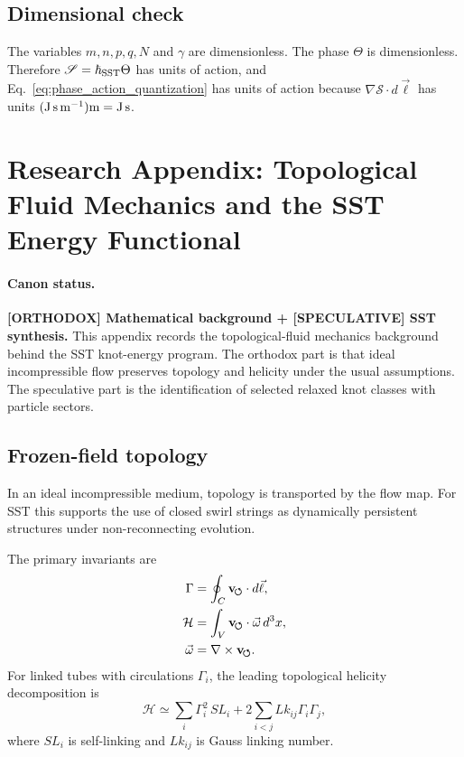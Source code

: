 \subsection{Dimensional check}
The variables $m,n,p,q,N$ and $\gamma$ are dimensionless. The phase $\Theta$ is dimensionless. Therefore $\mathscr S=\hbar_{\rm SST}\Theta$ has units of action, and Eq.~\eqref{eq:phase_action_quantization} has units of action because $\nabla\mathscr S\cdot d\vec\ell$ has units $({\rm J\,s\,m^{-1}}){\rm m}={\rm J\,s}$.

\section{Research Appendix: Topological Fluid Mechanics and the SST Energy Functional}
\label{app:tfm_energy_functional}

\paragraph{Canon status.}
\textbf{[ORTHODOX] Mathematical background + [SPECULATIVE] SST synthesis.}
This appendix records the topological-fluid mechanics background behind the SST knot-energy program. The orthodox part is that ideal incompressible flow preserves topology and helicity under the usual assumptions. The speculative part is the identification of selected relaxed knot classes with particle sectors.

\subsection{Frozen-field topology}
In an ideal incompressible medium, topology is transported by the flow map. For SST this supports the use of closed swirl strings as dynamically persistent structures under non-reconnecting evolution.

The primary invariants are
\begin{align}
    \Gamma &= \oint_C \mathbf{v}_{\!\boldsymbol{\circlearrowleft}}\cdot d\vec\ell,\label{eq:gamma_appendix}\\
    \mathcal H &= \int_V \mathbf{v}_{\!\boldsymbol{\circlearrowleft}}\cdot\vec\omega\,d^3x,\label{eq:helicity_appendix}\\
    \vec\omega &= \nabla\times\mathbf{v}_{\!\boldsymbol{\circlearrowleft}}.\label{eq:vorticity_appendix}
\end{align}
For linked tubes with circulations $\Gamma_i$, the leading topological helicity decomposition is
\begin{equation}
    \mathcal H
    \simeq
    \sum_i \Gamma_i^2\,SL_i
    +2\sum_{i<j}Lk_{ij}\Gamma_i\Gamma_j,
    \label{eq:helicity_link_decomposition}
\end{equation}
where $SL_i$ is self-linking and $Lk_{ij}$ is Gauss linking number.

